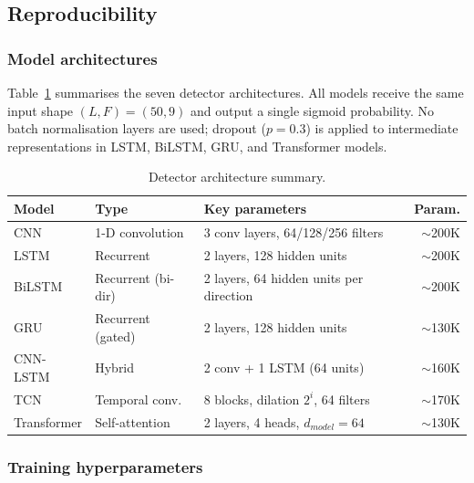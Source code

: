 
\subsection{Reproducibility}
\label{sec:reproducibility}

\subsubsection{Model architectures}

Table~\ref{tab:architectures} summarises the seven detector architectures.
All models receive the same input shape $(L, F) = (50, 9)$ and output a
single sigmoid probability.
No batch normalisation layers are used; dropout ($p=0.3$) is applied to
intermediate representations in LSTM, BiLSTM, GRU, and Transformer models.

\begin{table}[!t]
\caption{Detector architecture summary.}
\label{tab:architectures}
\centering
\small
\begin{tabular}{lllr}
\toprule
\textbf{Model} & \textbf{Type} & \textbf{Key parameters} & \textbf{Param.}\\
\midrule
CNN         & 1-D convolution   & 3 conv layers, 64/128/256 filters       & $\sim$200K \\
LSTM        & Recurrent         & 2 layers, 128 hidden units              & $\sim$200K \\
BiLSTM      & Recurrent (bi-dir)& 2 layers, 64 hidden units per direction & $\sim$200K \\
GRU         & Recurrent (gated) & 2 layers, 128 hidden units              & $\sim$130K \\
CNN-LSTM    & Hybrid            & 2 conv + 1 LSTM (64 units)              & $\sim$160K \\
TCN         & Temporal conv.    & 8 blocks, dilation $2^i$, 64 filters    & $\sim$170K \\
Transformer & Self-attention    & 2 layers, 4 heads, $d_{model}=64$       & $\sim$130K \\
\bottomrule
\end{tabular}
\end{table}

\subsubsection{Training hyperparameters}

